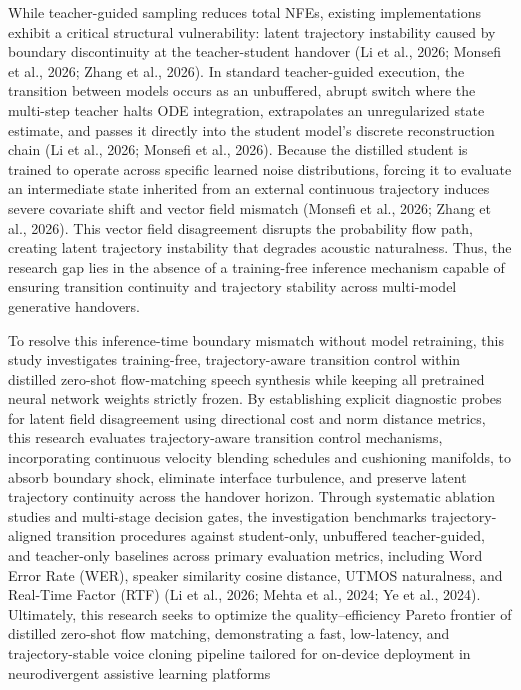 \documentclass[12pt,a4paper,oneside]{report}
\begin{document}
While teacher-guided sampling reduces total NFEs, existing implementations exhibit a critical structural vulnerability: latent trajectory instability caused by boundary discontinuity at the teacher-student handover (Li et al., 2026; Monsefi et al., 2026; Zhang et al., 2026). In standard teacher-guided execution, the transition between models occurs as an unbuffered, abrupt switch where the multi-step teacher halts ODE integration, extrapolates an unregularized state estimate, and passes it directly into the student model's discrete reconstruction chain (Li et al., 2026; Monsefi et al., 2026). Because the distilled student is trained to operate across specific learned noise distributions, forcing it to evaluate an intermediate state inherited from an external continuous trajectory induces severe covariate shift and vector field mismatch (Monsefi et al., 2026; Zhang et al., 2026). This vector field disagreement disrupts the probability flow path, creating latent trajectory instability that degrades acoustic naturalness. Thus, the research gap lies in the absence of a training-free inference mechanism capable of ensuring transition continuity and trajectory stability across multi-model generative handovers. 

To resolve this inference-time boundary mismatch without model retraining, this study investigates training-free, trajectory-aware transition control within distilled zero-shot flow-matching speech synthesis while keeping all pretrained neural network weights strictly frozen. By establishing explicit diagnostic probes for latent field disagreement using directional cost and norm distance metrics, this research evaluates trajectory-aware transition control mechanisms, incorporating continuous velocity blending schedules and cushioning manifolds, to absorb boundary shock, eliminate interface turbulence, and preserve latent trajectory continuity across the handover horizon. Through systematic ablation studies and multi-stage decision gates, the investigation benchmarks trajectory-aligned transition procedures against student-only, unbuffered teacher-guided, and teacher-only baselines across primary evaluation metrics, including Word Error Rate (WER), speaker similarity cosine distance, UTMOS naturalness, and Real-Time Factor (RTF) (Li et al., 2026; Mehta et al., 2024; Ye et al., 2024). Ultimately, this research seeks to optimize the quality--efficiency Pareto frontier of distilled zero-shot flow matching, demonstrating a fast, low-latency, and trajectory-stable voice cloning pipeline tailored for on-device deployment in neurodivergent assistive learning platforms
\end{document}
